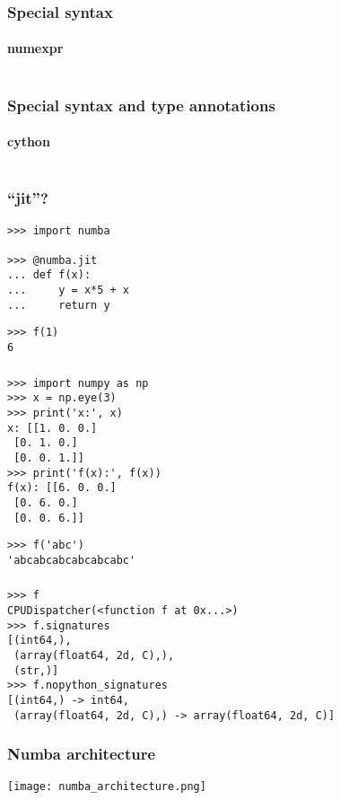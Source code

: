 \documentclass[serif]{beamer}
\begin{document}
\begin{frame}[fragile,t]
  \frametitle{Special syntax}
  \framesubtitle{numexpr}

  \inputminted{python3}{numexpr_evaluate.py}
\end{frame}

\begin{frame}[fragile,t]
  \frametitle{Special syntax and type annotations}
  \framesubtitle{cython}

  \inputminted{python3}{cython_integrate.pyx}
\end{frame}

\begin{frame}[fragile,t]
  \frametitle{``jit''?}

  \begin{verbatim}
>>> import numba

>>> @numba.jit
... def f(x):
...     y = x*5 + x
...     return y
  \end{verbatim}

  \pause
  \begin{verbatim}
>>> f(1)
6
  \end{verbatim}
\end{frame}

\begin{frame}[fragile,t]
  \frametitle{\phantom{N}}

  \begin{verbatim}
>>> import numpy as np
>>> x = np.eye(3)
>>> print('x:', x)
x: [[1. 0. 0.]
 [0. 1. 0.]
 [0. 0. 1.]]
>>> print('f(x):', f(x))
f(x): [[6. 0. 0.]
 [0. 6. 0.]
 [0. 0. 6.]]
  \end{verbatim}
  \pause
  \begin{verbatim}
>>> f('abc')
'abcabcabcabcabcabc'
  \end{verbatim}
\end{frame}

\begin{frame}[fragile,t]
  \frametitle{\phantom{N}}
  \begin{verbatim}
>>> f
CPUDispatcher(<function f at 0x...>)
>>> f.signatures
[(int64,),
 (array(float64, 2d, C),),
 (str,)]
>>> f.nopython_signatures
[(int64,) -> int64,
 (array(float64, 2d, C),) -> array(float64, 2d, C)]
  \end{verbatim}
\end{frame}

\begin{frame}
  \frametitle{Numba architecture}
  \hspace{-1cm}\texttt{[image: numba\_architecture.png]}
\end{frame}
\end{document}
